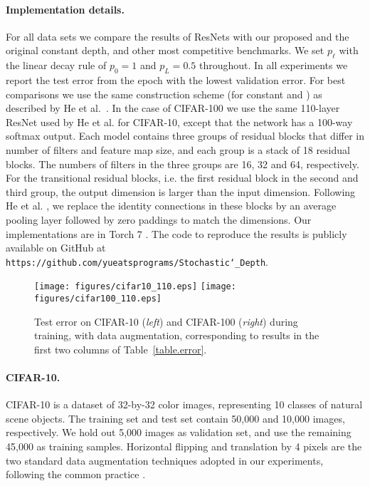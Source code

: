\documentclass[runningheads]{llncs}
\begin{document}
\paragraph{\textbf{Implementation details.}}
For all data sets we compare the results of ResNets with our proposed \name{} and the original constant depth, and other most competitive benchmarks. We set $p_\ell$ with the linear decay rule of $p_0\!=\!1$ and $p_L\!=\!0.5$ throughout. In all experiments we report the test error from the epoch with the lowest validation error.
For best comparisons we use the same construction scheme (for constant and \name{}) as described by He et al.~\cite{he2015deep}. In the case of CIFAR-100 we use the same 110-layer ResNet used by He et al. \cite{he2015deep} for CIFAR-10, except that the network has a 100-way softmax output. Each model contains three groups of residual blocks that differ in number of filters and feature map size, and each group is a stack of 18 residual blocks. The numbers of filters in the three groups are 16, 32 and 64, respectively. For the transitional residual blocks, i.e. the first residual block in the second and third group, the output dimension is larger than the input dimension. Following He et al. \cite{he2015deep}, we replace the identity connections in these blocks by an average pooling layer followed by zero paddings to match the dimensions.
Our implementations are in Torch 7 \cite{collobert2011torch7}. The code to reproduce the results is publicly available on GitHub at {\tt https://github.com/yueatsprograms/Stochastic\char`_Depth}.

\begin{figure*}[t]
	\begin{center}
		\centerline{
			\texttt{[image: figures/cifar10\_110.eps]}
			\texttt{[image: figures/cifar100\_110.eps]}}
		\vspace{-2ex}
		\caption{Test error on CIFAR-10 (\textit{left}) and CIFAR-100 (\textit{right}) during training,  with data augmentation, corresponding to results in the first two columns of Table~\ref{table.error}.}
		\vspace{-8ex}
		\label{figure.cifar}
	\end{center}
\end{figure*}

\paragraph{\textbf{CIFAR-10.}}
CIFAR-10 \cite{krizhevsky2009learning} is a dataset of 32-by-32 color images, representing 10 classes of natural scene objects. The training set and test set contain 50,000 and 10,000 images, respectively. We hold out 5,000 images as validation set, and use the remaining 45,000 as training samples. Horizontal flipping and translation by 4 pixels are the two standard data augmentation techniques adopted in our experiments, following the common practice \cite{goodfellow2013maxout,icml2013_wan13,lin2013network,lee2014deeply,springenberg2014striving,agostinelli2014learning,lee2015generalizing}.
\end{document}
